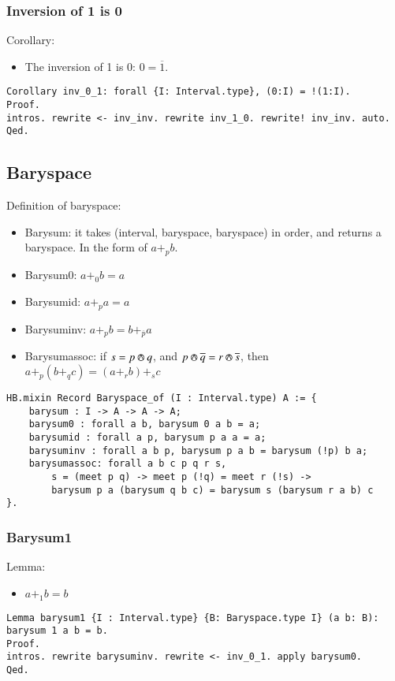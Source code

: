 \documentclass[a4paper,10pt]{article} %
\newcommand{\meet}{\circledwedge}
\begin{document}
\subsubsection{Inversion of 1 is 0}
Corollary: 
\begin{itemize}
    \item The inversion of 1 is 0: \(0 = \overline{1}\).
\end{itemize}
\begin{lstlisting}
Corollary inv_0_1: forall {I: Interval.type}, (0:I) = !(1:I).
Proof.
intros. rewrite <- inv_inv. rewrite inv_1_0. rewrite! inv_inv. auto.
Qed.
\end{lstlisting}

\subsection{Baryspace}
Definition of baryspace:
\begin{itemize}
    \item Barysum: it takes (interval, baryspace, baryspace) in order, and returns a baryspace. In the form of \(a +_p b\).
    \item Barysum0: \(a +_0 b = a\)
    \item Barysumid: \(a +_p a = a\)
    \item Barysuminv: \(a +_p b = b +_{\overline{p}} a\)
    \item Barysumassoc: if \(s = p \meet q\), and \(p \meet \overline{q} = r \meet \overline{s}\), then \(a +_p(b +_q c) = (a +_r b) +_s c\)
\end{itemize}
\begin{lstlisting}
HB.mixin Record Baryspace_of (I : Interval.type) A := {
    barysum : I -> A -> A -> A;
    barysum0 : forall a b, barysum 0 a b = a;
    barysumid : forall a p, barysum p a a = a;
    barysuminv : forall a b p, barysum p a b = barysum (!p) b a;
    barysumassoc: forall a b c p q r s, 
        s = (meet p q) -> meet p (!q) = meet r (!s) ->  
        barysum p a (barysum q b c) = barysum s (barysum r a b) c
}.
\end{lstlisting}

\subsubsection{Barysum1}
Lemma:
\begin{itemize}
    \item $a + _1b = b$
\end{itemize}
\begin{lstlisting}
Lemma barysum1 {I : Interval.type} {B: Baryspace.type I} (a b: B): barysum 1 a b = b.
Proof.
intros. rewrite barysuminv. rewrite <- inv_0_1. apply barysum0. 
Qed.
\end{lstlisting}
\end{document}
